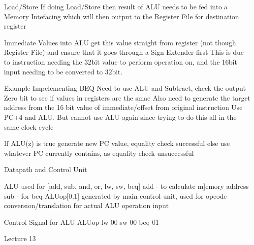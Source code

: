 \documentclass{article}
\begin{document}
		Load/Store
			If doing Load/Store then result of ALU needs to be fed into a Memory Intefacing which will then output to the Register File for destination register

		Immediate Values into ALU
			get this value straight from register (not though Register File) and ensure that it goes through a Sign Extender first
			This is due to instruction needing the 32bit value to perform operation on, and the 16bit input needing to be converted to 32bit.


	Example
		Impelementing BEQ
			Need to use ALU and Subtract, check the output Zero bit to see if values in registers are the smae
			Also need to generate the target address from the 16 bit value of immediate/offset from original instruction
				Use PC+4 and ALU. But cannot use ALU again since trying to do this all in the same clock cycle

			If ALU(z) is true
				generate new PC value, equality check successful
			else
				use whatever PC currently contains, as equality check unsuccessful

	Datapath and Control Unit

		ALU used for [add, sub, and, or, lw, sw, beq]
		add - to calculate m]emory address
		sub - for beq
		ALUop[0,1] generated by main control unit, used for opcode conversion/translation for actual ALU operation input

	Control Signal for ALU
			ALUop	
		lw	00
		sw	00
		beq	01
		
Lecture 13
\end{document}
